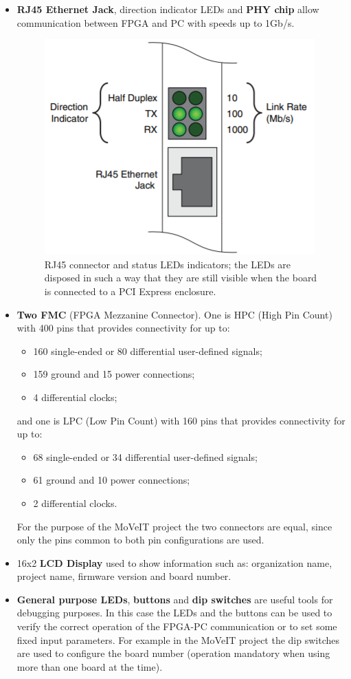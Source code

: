 \begin{itemize}
	\item \textbf{RJ45 Ethernet Jack}, direction indicator LEDs and \textbf{PHY chip} allow communication between FPGA and PC with speeds up to 1Gb/s.
	 \begin{figure}[H]
	 	\centering
	 	\includegraphics[width=0.2\linewidth]{IMG/ch3/PHY}
	 	\caption{RJ45 connector and status LEDs indicators; the LEDs are disposed in such a way that they are still visible when the board is connected to a PCI Express enclosure.}
	 	\label{fig:phy}
	 \end{figure}
	\item \textbf{Two FMC} (FPGA Mezzanine Connector). One is HPC (High Pin Count) with 400 pins that provides connectivity for up to:
	\begin{itemize}
		\item 160 single-ended or 80 differential user-defined signals;
		\item 159 ground and 15 power connections;
		\item 4 differential clocks;
	\end{itemize}
	\noindent and one is LPC (Low Pin Count) with 160 pins that provides connectivity for up to:
	\begin{itemize}
		\item 68 single-ended or 34 differential user-defined signals;
		\item 61 ground and 10 power connections;
		\item 2 differential clocks.
	\end{itemize}
	For the purpose of the MoVeIT project the two connectors are equal, since only the pins common to both pin configurations are used.
	\item 16x2 \textbf{LCD Display} used to show information such as: organization name, project name, firmware version and board number.
	\item \textbf{General purpose LEDs}, \textbf{buttons} and \textbf{dip switches} are useful tools for debugging purposes. In this case the LEDs and the buttons can be used to verify the correct operation of the FPGA-PC communication or to set some fixed input parameters. For example in the MoVeIT project the dip switches are used to configure the board number (operation mandatory when using more than one board at the time).  

\end{itemize}
